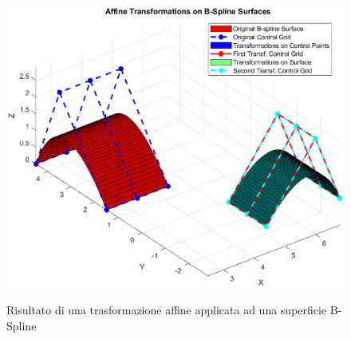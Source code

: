 \documentclass[a4paper, 12pt]{article}
\begin{document}


\begin{figure}[h!]
	\centering
	\caption{Risultato di una trasformazione affine applicata ad una superficie B-Spline}
	\includegraphics[scale=0.7]{surface_affine_trans_plot.eps}
	\label{fig:BSplineSurfaceAffineTrans}
\end{figure}
\end{document}
